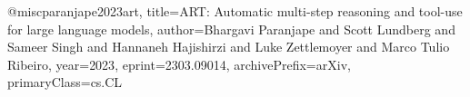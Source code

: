@misc{paranjape2023art,
      title={ART: Automatic multi-step reasoning and tool-use for large language models}, 
      author={Bhargavi Paranjape and Scott Lundberg and Sameer Singh and Hannaneh Hajishirzi and Luke Zettlemoyer and Marco Tulio Ribeiro},
      year={2023},
      eprint={2303.09014},
      archivePrefix={arXiv},
      primaryClass={cs.CL}
}